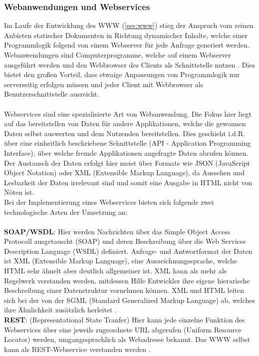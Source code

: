 \subsubsection{Webanwendungen und Webservices}\label{sec:webanwenservices}
Im Laufe der Entwicklung des WWW (\ref{sec:www}) stieg der Anspruch vom reinen Anbieten statischer Dokumenten in Richtung dynamischer Inhalte, welche einer Programmlogik folgend von einem Webserver für jede Anfrage generiert werden. Webanwendungen sind Computerprogramme, welche auf einem Webserver ausgeführt werden und den Webbrowser des Clients als Schnittstelle nutzen \cite{Safran2011}. Dies bietet den großen Vorteil, dass etwaige Anpassungen von Programmlogik nur serverseitig erfolgen müssen und jeder Client mit Webbrowser als Benutzerschnittstelle ausreicht. \\ \\
Webservices sind eine spezialisierte Art von Webanwendung. Die Fokus hier liegt auf das bereitstellen von Daten für andere Applikationen, welche die gewonnen Daten selbst auswerten und dem Nutzenden bereitstellen. Dies geschieht i.d.R. über eine einheitlich beschriebene Schnittstelle (API - Application Programming Interface), über welche fremde Applikationen angefragte Daten abrufen können. Der Austausch der Daten erfolgt hier meist über Formate wie JSON (JavaScript Object Notation) oder XML (Extensible Markup Language), da Aussehen und Lesbarkeit der Daten irrelevant sind und somit eine Ausgabe in HTML nicht von Nöten ist. \\
Bei der Implementierung eines Webservices bieten sich folgende zwei technologische Arten der Umsetzung an: \\ \\
\textbf{SOAP/WSDL}: Hier werden Nachrichten über das Simple Object Access Protocoll ausgetauscht (SOAP) und deren Beschreibung über die Web Services Description Language (WSDL) definiert. Anfrage- und Antwortformat der Daten ist XML (Extensible Markup Language), eine Auszeichnungssprache, welche HTML sehr ähnelt aber deutlich allgemeiner ist. XML kann als mehr als Regelwerk verstanden werden, mitdessen Hilfe Entwickler ihre eigene hierarische Beschreibung einer Datenstruktur vornehmen können. XML und HTML leiten sich bei der von der SGML (Standard Generalized Markup Language) ab, welches ihre Ähnlichkeit zusätzlich herleitet \cite{XMLHTMLU88:online}. \\

 
\textbf{REST}: (Representational State Tranfer) Hier kann jede einzelne Funktion des Webservices über eine jeweils zugeordnete URL abgerufen (Uniform Resource Locator) werden, umgangssprachlich als Webadresse bekannt. Das WWW selbst kann als REST-Webservice verstanden werden \cite{Bayer2002:online}. \\ 

